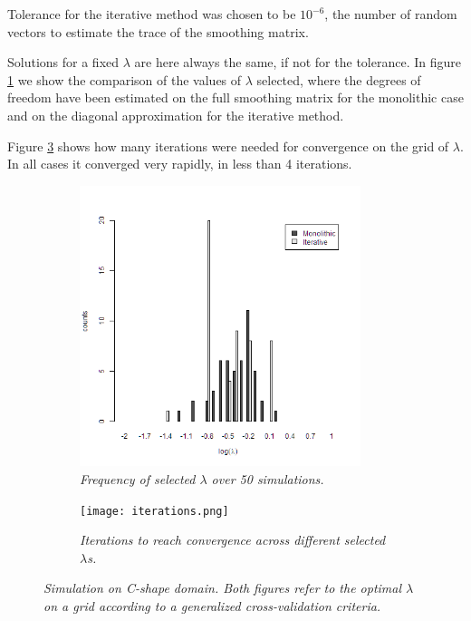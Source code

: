 Tolerance for the iterative method was chosen to be $10^{-6}$, the number of
random vectors to estimate the trace of the smoothing matrix.

Solutions for a fixed $\lambda$ are here always the same, if not for the
tolerance. In figure \ref{lambda} we show the comparison of the values of
$\lambda$ selected, where the degrees of freedom have been estimated on the
full smoothing matrix for the monolithic case and on the diagonal approximation
for the iterative method.

Figure \ref{iterations} shows how many iterations were needed for convergence
on the grid of $\lambda$. In all cases it converged very rapidly, in less than
4 iterations.
\begin{figure}[t]
	\flushleft
	\begin{subfigure}{0.49\textwidth}
		\includegraphics[width=0.9\textwidth]{images/lambda.png}
		\centering
		\caption{\textit{Frequency of selected $\lambda$ over 50 simulations. }}
		\label{lambda}
	\end{subfigure}
	\hfill
	\begin{subfigure}{0.49\textwidth}
		\texttt{[image: iterations.png]}
		\centering
		\caption{\textit{ Iterations to reach convergence across different selected $\lambda$s. }}
		\label{iterations}
	\end{subfigure}
	\caption{\textit{Simulation on C-shape domain. Both figures refer to
			the optimal $\lambda$ on a grid according to a generalized cross-validation
			criteria.}}
\end{figure}
